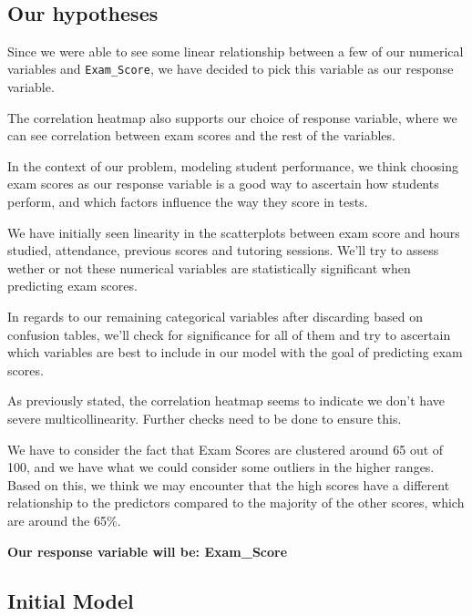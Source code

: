 \documentclass[11pt]{article}
\begin{document}
    \begin{center}
    \end{center}
    { \hspace*{\fill} \\}
    
    \subsection{Our hypotheses}\label{our-hypotheses}

    Since we were able to see some linear relationship between a few of our
numerical variables and \texttt{Exam\_Score}, we have decided to pick
this variable as our response variable.

The correlation heatmap also supports our choice of response variable,
where we can see correlation between exam scores and the rest of the
variables.

In the context of our problem, modeling student performance, we think
choosing exam scores as our response variable is a good way to ascertain
how students perform, and which factors influence the way they score in
tests.

We have initially seen linearity in the scatterplots between exam score
and hours studied, attendance, previous scores and tutoring sessions.
We'll try to assess wether or not these numerical variables are
statistically significant when predicting exam scores.

In regards to our remaining categorical variables after discarding based
on confusion tables, we'll check for significance for all of them and
try to ascertain which variables are best to include in our model with
the goal of predicting exam scores.

As previously stated, the correlation heatmap seems to indicate we don't
have severe multicollinearity. Further checks need to be done to ensure
this.

We have to consider the fact that Exam Scores are clustered around 65
out of 100, and we have what we could consider some outliers in the
higher ranges. Based on this, we think we may encounter that the high
scores have a different relationship to the predictors compared to the
majority of the other scores, which are around the 65\%.

    \textbf{Our response variable will be: Exam\_Score}

    \subsection{Initial Model}\label{initial-model}
\end{document}
